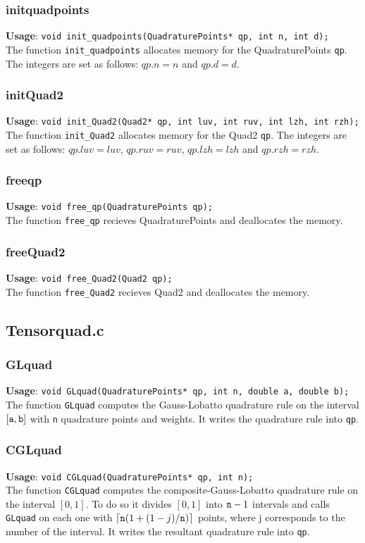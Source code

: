 \documentclass[a4paper,10pt]{article}
\begin{document}
\subsubsection{init\textunderscore quadpoints}
\textbf{Usage}: \verb=void init_quadpoints(QuadraturePoints* qp, int n, int d); =\\
The function \verb=init_quadpoints= allocates memory for the QuadraturePoints \verb=qp=. The integers
are set as follows: $qp.n=n$ and $qp.d=d$.
\subsubsection{init\textunderscore Quad2}
\textbf{Usage}: \verb=void init_Quad2(Quad2* qp, int luv, int ruv, int lzh, int rzh);=\\
The function \verb=init_Quad2= allocates memory for the Quad2 \verb=qp=. The integers
are set as follows: $qp.luv=luv$, $qp.ruv=ruv$, $qp.lzh=lzh$ and $qp.rzh=rzh$.
\subsubsection{free\textunderscore qp}
\textbf{Usage}: \verb=void free_qp(QuadraturePoints qp);=\\
The function \verb=free_qp= recieves QuadraturePoints and deallocates the memory.
\subsubsection{free\textunderscore Quad2}
\textbf{Usage}: \verb=void free_Quad2(Quad2 qp);=\\
The function \verb=free_Quad2= recieves Quad2 and deallocates the memory.

\subsection{Tensorquad.c}\label{sec:Tensorquad}
\subsubsection{GLquad}
\textbf{Usage}: \verb=void GLquad(QuadraturePoints* qp, int n, double a, double b);=\\
The function \verb=GLquad= computes the Gauss-Lobatto quadrature rule on the interval $[\verb=a=,\verb=b=]$
 with \verb=n= quadrature points and weights. It writes the quadrature rule into \verb=qp=.
\subsubsection{CGLquad}
\textbf{Usage}: \verb=void CGLquad(QuadraturePoints* qp, int n);=\\
The function \verb=CGLquad= computes the composite-Gauss-Lobatto quadrature rule on the interval 
$[0,1]$. To do so it divides $[0,1]$ into $\verb=n=-1$ intervals and calls \verb=GLquad= on each one 
with $\lceil\verb=n=(1+(1-j)/\verb=n=)\rceil$ points, where j corresponds to the number of the interval.
 It writes the resultant quadrature rule into \verb=qp=.
\end{document}
